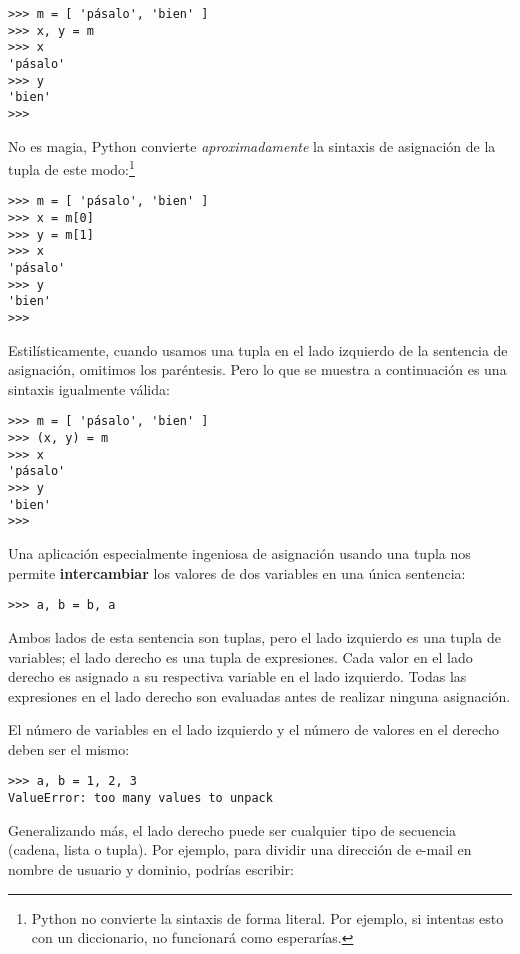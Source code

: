 \beforeverb
\begin{verbatim}
>>> m = [ 'pásalo', 'bien' ]
>>> x, y = m
>>> x
'pásalo'
>>> y
'bien'
>>> 
\end{verbatim}
\afterverb
%
No es magia, Python convierte \emph{aproximadamente} la
sintaxis de asignación de la tupla
de este modo:\footnote{Python no convierte la
sintaxis de forma literal. Por ejemplo, si intentas esto con un diccionario,
no funcionará como esperarías.}

\beforeverb
\begin{verbatim}
>>> m = [ 'pásalo', 'bien' ]
>>> x = m[0]
>>> y = m[1]
>>> x
'pásalo'
>>> y
'bien'
>>> 
\end{verbatim}
\afterverb

Estilísticamente, cuando usamos una tupla en el lado izquierdo de la sentencia
de asignación, omitimos los paréntesis. Pero lo que se muestra a continuación
es una sintaxis igualmente válida:

\beforeverb
\begin{verbatim}
>>> m = [ 'pásalo', 'bien' ]
>>> (x, y) = m
>>> x
'pásalo'
>>> y
'bien'
>>> 
\end{verbatim}
\afterverb
%
Una aplicación especialmente ingeniosa de asignación usando una tupla nos
permite {\bf intercambiar} los valores de dos variables en una única sentencia:

\beforeverb
\begin{verbatim}
>>> a, b = b, a
\end{verbatim}
\afterverb
%
Ambos lados de esta sentencia son tuplas, pero
el lado izquierdo es una tupla de variables; el lado derecho es una tupla
de expresiones. Cada valor en el lado derecho
es asignado a su respectiva variable en el lado izquierdo.
Todas las expresiones en el lado derecho son evaluadas antes de
realizar ninguna asignación.

El número de variables en el lado izquierdo y el número de
valores en el derecho deben ser el mismo:


\beforeverb
\begin{verbatim}
>>> a, b = 1, 2, 3
ValueError: too many values to unpack
\end{verbatim}
\afterverb
%
Generalizando más, el lado derecho puede ser cualquier tipo de secuencia
(cadena, lista o tupla). Por ejemplo, para dividir una dirección de e-mail
en nombre de usuario y dominio, podrías escribir:


